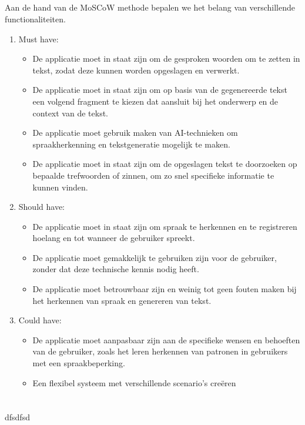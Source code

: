\subsection{}%

Aan de hand van de MoSCoW methode bepalen we het belang van verschillende functionaliteiten.

\begin{enumerate}
    \item Must have:
    \begin{itemize}
        \item De applicatie moet in staat zijn om de gesproken woorden om te zetten in tekst, zodat deze kunnen worden opgeslagen en verwerkt.
        \item De applicatie moet in staat zijn om op basis van de gegenereerde tekst een volgend fragment te kiezen dat aansluit bij het onderwerp en de context van de tekst.
        \item De applicatie moet gebruik maken van AI-technieken om spraakherkenning en tekstgeneratie mogelijk te maken.
        \item  De applicatie moet in staat zijn om de opgeslagen tekst te doorzoeken op bepaalde trefwoorden of zinnen, om zo snel specifieke informatie te kunnen vinden.
    \end{itemize}
    \item Should have:
    \begin{itemize}
        \item De applicatie moet in staat zijn om spraak te herkennen en te registreren hoelang en tot wanneer de gebruiker spreekt.
        \item De applicatie moet gemakkelijk te gebruiken zijn voor de gebruiker, zonder dat deze technische kennis nodig heeft.
        \item De applicatie moet betrouwbaar zijn en weinig tot geen fouten maken bij het herkennen van spraak en genereren van tekst.
    \end{itemize}
    \item Could have:
    \begin{itemize}
        \item De applicatie moet aanpasbaar zijn aan de specifieke wensen en behoeften van de gebruiker, zoals het leren herkennen van patronen in gebruikers met een spraakbeperking.
        \item Een flexibel systeem met verschillende scenario’s creëren
    \end{itemize}
\end{enumerate}

\subsection{}%




\section{} \label{sect:Proof-of-concept}%

dfsdfsd